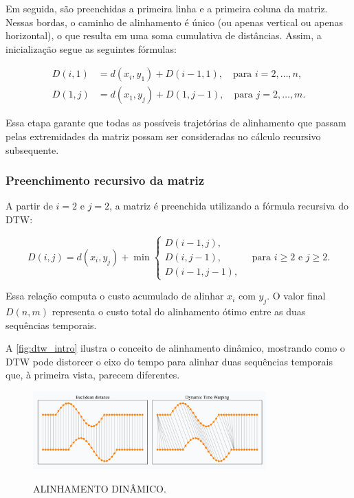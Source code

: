 Em seguida, são preenchidas a primeira linha e a primeira coluna da matriz. Nessas bordas, o caminho de alinhamento é único (ou apenas vertical ou apenas horizontal), o que resulta em uma soma cumulativa de distâncias. Assim, a inicialização segue as seguintes fórmulas:

\begin{align}
    D(i,1) &= d(x_i, y_1) + D(i-1,1), \quad \text{para } i = 2, \ldots, n, \\
    D(1,j) &= d(x_1, y_j) + D(1,j-1), \quad \text{para } j = 2, \ldots, m.
\end{align}

Essa etapa garante que todas as possíveis trajetórias de alinhamento que passam pelas extremidades da matriz possam ser consideradas no cálculo recursivo subsequente.

\subsubsection*{Preenchimento recursivo da matriz}

A partir de \(i = 2\) e \(j = 2\), a matriz é preenchida utilizando a fórmula recursiva do DTW:

\begin{equation}
    D(i, j) = d(x_i, y_j) + \min \begin{cases}
        D(i-1, j), \\
        D(i, j-1), \\
        D(i-1, j-1),
    \end{cases}
    \quad \text{para } i \geq 2 \text{ e } j \geq 2.
\end{equation}

Essa relação computa o custo acumulado de alinhar \(x_i\) com \(y_j\). O valor final \(D(n, m)\) representa o custo total do alinhamento ótimo entre as duas sequências temporais.


A \autoref{fig:dtw_intro} ilustra o conceito de alinhamento dinâmico, mostrando como o DTW pode distorcer o eixo do tempo para alinhar duas sequências temporais que, à primeira vista, parecem diferentes.

\begin{figure}[h!]
    \centering
    \caption{ALINHAMENTO DINÂMICO.}
    \includegraphics[width=0.8\textwidth]{fig/dtw_vs_euc.png}
    \label{fig:dtw_intro}
\end{figure}

